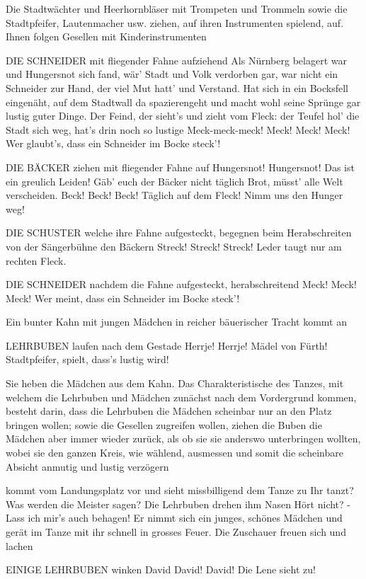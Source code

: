 \begin{drama}
Die Stadtwächter und Heerhornbläser mit Trompeten und Trommeln sowie die Stadtpfeifer, Lautenmacher usw. ziehen, auf ihren Instrumenten spielend, auf. Ihnen folgen Gesellen mit Kinderinstrumenten

DIE SCHNEIDER
mit fliegender Fahne aufziehend
Als Nürnberg belagert war
und Hungersnot sich fand,
wär' Stadt und Volk verdorben gar,
war nicht ein Schneider zur Hand,
der viel Mut hatt' und Verstand.
Hat sich in ein Bocksfell eingenäht,
auf dem Stadtwall da spazierengeht
und macht wohl seine Sprünge
gar lustig guter Dinge.
Der Feind, der sieht's und zieht vom Fleck:
der Teufel hol' die Stadt sich weg,
hat's drin noch so lustige Meck-meck-meck!
Meck! Meck! Meck!
Wer glaubt's, dass ein Schneider im Bocke steck'!

DIE BÄCKER
ziehen mit fliegender Fahne auf
Hungersnot! Hungersnot!
Das ist ein greulich Leiden!
Gäb' euch der Bäcker nicht täglich Brot,
müsst' alle Welt verscheiden.
Beck! Beck! Beck!
Täglich auf dem Fleck!
Nimm uns den Hunger weg!

DIE SCHUSTER
welche ihre Fahne aufgesteckt, begegnen beim Herabschreiten von der Sängerbühne den Bäckern
Streck! Streck! Streck!
Leder taugt nur am rechten Fleck.

DIE SCHNEIDER
nachdem die Fahne aufgesteckt, herabschreitend
Meck! Meck! Meck!
Wer meint, dass ein Schneider im Bocke steck'!

Ein bunter Kahn mit jungen Mädchen in reicher bäuerischer Tracht kommt an

LEHRBUBEN
laufen nach dem Gestade
Herrje! Herrje! Mädel von Fürth!
Stadtpfeifer, spielt, dass's lustig wird!

Sie heben die Mädchen aus dem Kahn. Das Charakteristische des Tanzes, mit welchem die Lehrbuben und Mädchen zunächst nach dem Vordergrund kommen, besteht darin, dass die Lehrbuben die Mädchen scheinbar nur an den Platz bringen wollen; sowie die Gesellen zugreifen wollen, ziehen die Buben die Mädchen aber immer wieder zurück, als ob sie sie anderswo unterbringen wollten, wobei sie den ganzen Kreis, wie wählend, ausmessen und somit die scheinbare Absicht anmutig und lustig verzögern

\Davidspeaks
kommt vom Landungsplatz vor und sieht missbilligend dem Tanze zu
Ihr tanzt? Was werden die Meister sagen?
Die Lehrbuben drehen ihm Nasen
Hört nicht? - Lass ich mir's auch behagen!
Er nimmt sich ein junges, schönes Mädchen und gerät im Tanze mit ihr schnell in grosses Feuer. Die Zuschauer freuen sich und lachen

EINIGE LEHRBUBEN
winken David
David! David! Die Lene sieht zu!


\end{drama}
